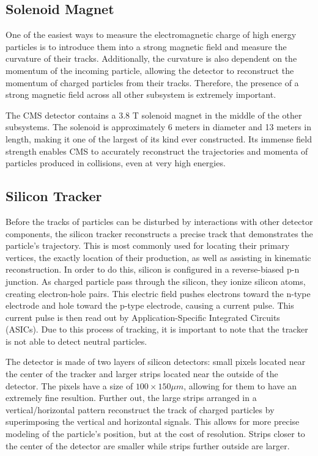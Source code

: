 \subsection{Solenoid Magnet}

One of the easiest ways to measure the electromagnetic charge of high energy particles is to introduce them into a strong magnetic field and measure the curvature of their tracks. Additionally, the curvature is also dependent on the momentum of the incoming particle, allowing the detector to reconstruct the momentum of charged particles from their tracks. Therefore, the presence of a strong magnetic field across all other subsystem is extremely important. 

The CMS detector contains a 3.8 T solenoid magnet in the middle of the other subsystems. The solenoid is approximately 6 meters in diameter and 13 meters in length, making it one of the largest of its kind ever constructed. Its immense field strength enables CMS to accurately reconstruct the trajectories and momenta of particles produced in collisions, even at very high energies.

\subsection{Silicon Tracker}

Before the tracks of particles can be disturbed by interactions with other detector components, the silicon tracker reconstructs a precise track that demonstrates the particle's trajectory. This is most commonly used for locating their primary vertices, the exactly location of their production, as well as assisting in kinematic reconstruction. In order to do this, silicon is configured in a reverse-biased p-n junction. As charged particle pass through the silicon, they ionize silicon atoms, creating electron-hole pairs. This electric field pushes electrons toward the n-type electrode and hole toward the p-type electrode, causing a current pulse. This current pulse is then read out by Application-Specific Integrated Circuits (ASICs). Due to this process of tracking, it is important to note that the tracker is not able to detect neutral particles. 

The detector is made of two layers of silicon detectors: small pixels located near the center of the tracker and larger strips located near the outside of the detector. The pixels have a size of $100 \times 150 \mu m$, allowing for them to have an extremely fine resultion. Further out, the large strips arranged in a vertical/horizontal pattern reconstruct the track of charged particles by superimposing the vertical and horizontal signals. This allows for more precise modeling of the particle's position, but at the cost of resolution. Strips closer to the center of the detector are smaller while strips further outside are larger. 

